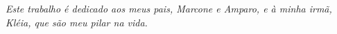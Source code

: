 \begin{dedicatoria}
   \vspace*{\fill}
   \centering
   \noindent
   \textit{Este trabalho é dedicado aos meus pais, Marcone e Amparo, e à minha irmã, Kléia, que são meu pilar na vida.} 
   \vspace*{\fill}
\end{dedicatoria}
